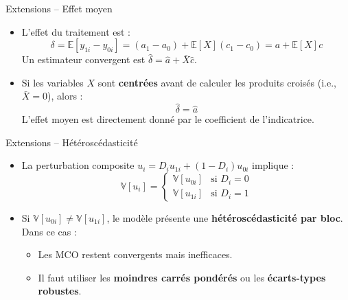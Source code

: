 \documentclass[11pt,aspectratio=169]{beamer}
\newcommand{\E}{\mathbb{E}}
\newcommand{\Var}{\mathbb{V}}
\begin{document}
\begin{frame}{Extensions -- Effet moyen}

\begin{itemize}

\item L'effet du traitement est :
  \[
  \delta = \E[y_{1i} - y_{0i}] = (a_1 - a_0) + \E[X](c_1 - c_0) = a + \E[X] c
  \]
  Un estimateur convergent est $\hat{\delta} = \hat{a} + \bar{X} \hat{c}$.\newline

\item Si les variables $X$ sont \textbf{centrées} avant de calculer les produits croisés (i.e., $\bar{X} = 0$), alors :
  \[
  \boxed{\hat{\delta} = \hat{a}}
  \]
  L'effet moyen est directement donné par le coefficient de l'indicatrice.

\end{itemize}

\end{frame}

\begin{frame}{Extensions -- Hétéroscédasticité}

\begin{itemize}

\item La perturbation composite $u_i = D_i u_{1i} + (1-D_i) u_{0i}$ implique :
  \[
  \Var[u_i] = \begin{cases}
      \Var[u_{0i}] & \text{si } D_i = 0 \\
      \Var[u_{1i}] & \text{si } D_i = 1
  \end{cases}
  \]\newline

\item Si $\Var[u_{0i}] \neq \Var[u_{1i}]$, le modèle présente une \textbf{hétéroscédasticité par bloc}. Dans ce cas :
  \begin{itemize}
  \item Les MCO restent convergents mais inefficaces.
  \item Il faut utiliser les \textbf{moindres carrés pondérés} ou les \textbf{écarts-types robustes}.
  \end{itemize}

\end{itemize}

\end{frame}
\end{document}
